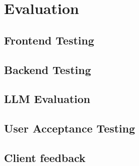 \chapter{Evaluation}


\section{Frontend Testing}

\section{Backend Testing}

\section{LLM Evaluation}

\section{User Acceptance Testing}

\section{Client feedback}